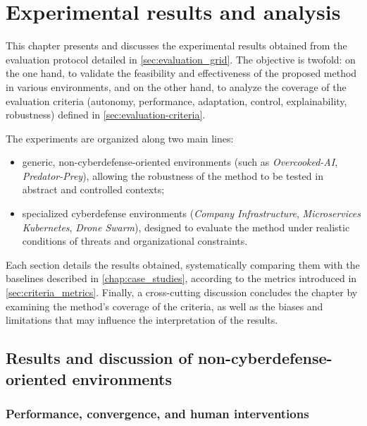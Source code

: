 \clearpage
\thispagestyle{empty}
\null
\newpage


\chapter{Experimental results and analysis}

This chapter presents and discusses the experimental results obtained from the evaluation protocol detailed in \autoref{sec:evaluation_grid}.
The objective is twofold: on the one hand, to validate the feasibility and effectiveness of the proposed method in various environments, and on the other hand, to analyze the coverage of the evaluation criteria (autonomy, performance, adaptation, control, explainability, robustness) defined in \autoref{sec:evaluation-criteria}.

The experiments are organized along two main lines:
\begin{itemize}
  \item generic, non-cyberdefense-oriented environments (such as \textit{Overcooked-AI}, \textit{Predator-Prey}), allowing the robustness of the method to be tested in abstract and controlled contexts;
  \item specialized cyberdefense environments (\textit{Company Infrastructure}, \textit{Microservices Kubernetes}, \textit{Drone Swarm}), designed to evaluate the method under realistic conditions of threats and organizational constraints.
\end{itemize}

Each section details the results obtained, systematically comparing them with the baselines described in \autoref{chap:case_studies}, according to the metrics introduced in \autoref{sec:criteria_metrics}.
Finally, a cross-cutting discussion concludes the chapter by examining the method's coverage of the criteria, as well as the biases and limitations that may influence the interpretation of the results.

\section{Results and discussion of non-cyberdefense-oriented environments}\label{sec:results_and_discussion_cyberdefense}

\subsection*{Performance, convergence, and human interventions}


